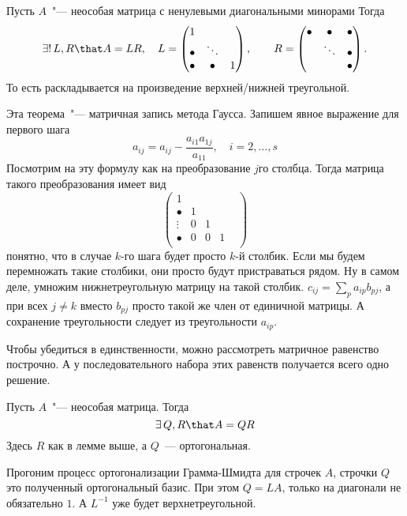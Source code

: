 \documentclass{trlnotes}
\begin{document}
\begin{lem}\label{lem:lin::factor::lr}
  Пусть $A$~"--- неособая матрица с ненулевыми диагональными минорами
  Тогда
  \[
    \exists!\, L,R \that A = LR, \quad
    L = \begin{pmatrix}
      1 &  & \\
      \bullet  & \ddots  & \\
      \bullet &\bullet &1\\
    \end{pmatrix} , \qquad
    R = \begin{pmatrix}
      \bullet & \bullet & \bullet\\
        & \ddots  & \bullet\\
        &         &\bullet\\
    \end{pmatrix}.
  \]
  То есть раскладывается на произведение верхней/нижней треугольной.
\end{lem}
\begin{prf}
  Эта теорема~"--- матричная запись метода Гаусса. 
  Запишем явное выражение для первого шага
  \[
    a_{ij} = a_{ij} - \frac{a_{i1}a_{1j}}{a_{11}}, \quad i = 2, \dotsc, s
  \]
  Посмотрим на эту формулу как на преобразование $j$го столбца. Тогда матрица 
  такого преобразования имеет вид
  \[
    \begin{pmatrix}
      1 &   & & & \\
      \bullet  & 1 & & \\
      \vdots  & 0 & 1& \\
      \bullet  & 0 & 0& 1\\
    \end{pmatrix}
  \]
  понятно, что в случае $k$-го шага будет просто $k$-й столбик.
  Если мы будем перемножать такие столбики, они просто будут пристраваться рядом.
  Ну в самом деле, умножим нижнетреугольную  матрицу на такой столбик.
  $c_{ij} = \sum_{p}a_{ip}b_{pj}$, а при всех $j \neq k$ вместо $b_{pj}$ просто
  такой же член от единичной матрицы. А сохранение треугольности следует из
  треугольности $a_{ip}$.
  
  Чтобы убедиться в единственности, можно рассмотреть матричное равенство
  построчно. А у последовательного 
  набора этих равенств получается всего одно решение.
\end{prf}


\begin{lem}\label{lem:lin::factor::qr}
  Пусть $A$~"--- неособая матрица.
  Тогда
  \[
    \exists\, Q,R \that A = QR
  \]
  Здесь $R$ как в лемме выше, а $Q$~--- ортогональная.
\end{lem}
\begin{prf}
  Прогоним процесс ортогонализации Грамма-Шмидта для строчек $A$, 
  строчки $Q$ это полученный ортогональный базис. 
  При этом $Q = LA$, только на диагонали не обязательно $1$.
  А $L^{-1}$ уже будет верхнетреугольной.
\end{prf}
\end{document}
